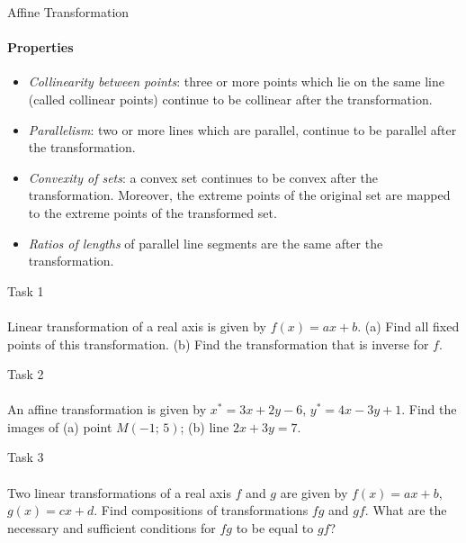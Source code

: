 \documentclass[aspectratio=169]{beamer}
\begin{document}
\begin{frame}[t]{Affine Transformation}
    \framesubtitle{Properties}
        \begin{itemize}
            \item \textit{Collinearity between points}: three or more points which lie on the same line (called collinear points) continue to be collinear after the transformation.
            \item \textit{Parallelism}: two or more lines which are parallel, continue to be parallel after the transformation.
            \item \textit{Convexity of sets}: a convex set continues to be convex after the transformation. Moreover, the extreme points of the original set are mapped to the extreme points of the transformed set.
            \item \textit{Ratios of lengths} of parallel line segments are the same after the transformation.
        \end{itemize}
    \end{frame}

\begin{frame}[t]{Task 1}
    \framesubtitle{}
    Linear transformation of a real axis is given by $f(x)=ax+b$. (a) Find all fixed points of this transformation. (b) Find the transformation that is inverse for $f$.

\end{frame}

\begin{frame}[t]{Task 2}
    \framesubtitle{}
    An affine transformation is given by $x^*=3x+2y-6$, $y^*=4x-3y+1$. Find the images of (a) point $M(-1;\,5)$; (b) line $2x+3y=7$.

\end{frame}




\begin{frame}[t]{Task 3}
    \framesubtitle{}
    Two linear transformations of a real axis $f$ and $g$ are given by $f(x)=ax+b$, $g(x)=cx+d$. Find compositions of transformations $fg$ and $gf$. What are the necessary and sufficient conditions for $fg$ to be equal to $gf$?
    
\end{frame}
\end{document}
